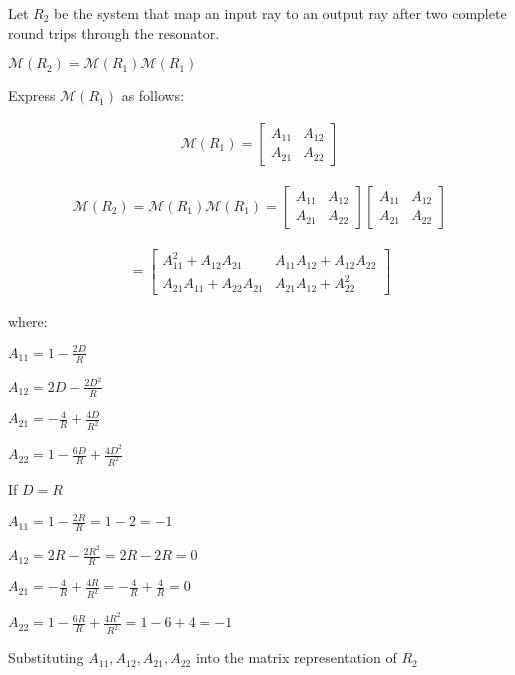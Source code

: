 \documentclass[fleqn]{article}
\begin{document}
\begin{enumerate}[nolistsep]
			Let $R_2$ be the system that map an input ray to an output ray after two complete round trips through the resonator.
			
			$\mathcal{M}(R_2) = \mathcal{M}(R_1)\mathcal{M}(R_1)$
			
			Express $\mathcal{M}(R_1)$ as follows:
			
			\begin{align*}
				\mathcal{M}(R_1) = \begin{bmatrix}A_{11} & A_{12}\\ A_{21} & A_{22}\end{bmatrix}
			\end{align*}
			
			\begin{align*}
				\mathcal{M}(R_2) = \mathcal{M}(R_1)\mathcal{M}(R_1) = \begin{bmatrix}A_{11} & A_{12}\\ A_{21} & A_{22}\end{bmatrix}\begin{bmatrix}A_{11} & A_{12}\\ A_{21} & A_{22}\end{bmatrix}
			\end{align*}
			
			\begin{align*}
				= \begin{bmatrix}A_{11}^2 + A_{12}A_{21} & A_{11}A_{12} + A_{12}A_{22}\\ A_{21}A_{11} + A_{22}A_{21} & A_{21}A_{12} + A_{22}^2\end{bmatrix}
			\end{align*}
			
			where:
			
			$A_{11} = 1 - \frac{2D}{R}$
			
			$A_{12} = 2D - \frac{2D^2}{R}$
			
			$A_{21} = -\frac{4}{R} + \frac{4D}{R^2}$
			
			$A_{22} = 1 - \frac{6D}{R} + \frac{4D^2}{R^2}$
			
			\pagebreak			
			If $D = R$
			
			$A_{11} = 1 - \frac{2R}{R} = 1 - 2 = -1$
			
			$A_{12} = 2R - \frac{2R^2}{R} = 2R - 2R = 0$
			
			$A_{21} = -\frac{4}{R} + \frac{4R}{R^2} = -\frac{4}{R} + \frac{4}{R} = 0$
			
			$A_{22} = 1 - \frac{6R}{R} + \frac{4R^2}{R^2} = 1 - 6 + 4 = -1$
			
			Substituting $A_{11}, A_{12}, A_{21}, A_{22}$ into the matrix representation of $R_2$
			

\end{enumerate}
\end{document}
